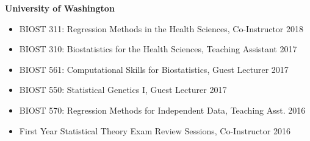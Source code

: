 \documentclass[margin]{res}
\begin{document}
\begin{resume}
\textbf{University of Washington}
\begin{itemize}
\item BIOST 311: Regression Methods in the Health Sciences, Co-Instructor \hfill  2018 
\item BIOST 310: Biostatistics for the Health Sciences, Teaching Assistant  \hfill 2017 
\item BIOST 561: Computational Skills for Biostatistics, Guest Lecturer \hfill 2017
\item BIOST 550: Statistical Genetics I, Guest Lecturer  \hfill 2017 
\item BIOST 570: Regression Methods for Independent Data, Teaching Asst.  \hfill 2016 
\item First Year Statistical Theory Exam Review Sessions, Co-Instructor  \hfill 2016 
\end{itemize}



\end{resume}
\end{document}
